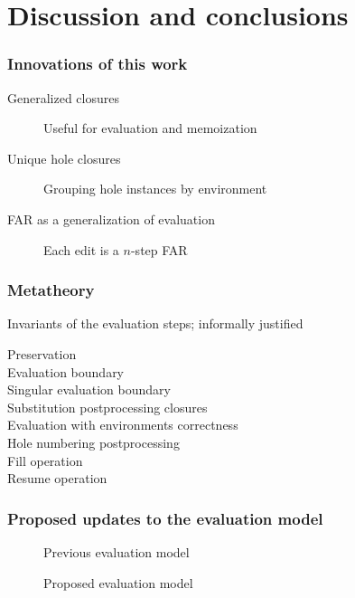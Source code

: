 \documentclass{beamer}
\begin{document}
\section{Discussion and conclusions}

\begin{frame}
  \frametitle{Innovations of this work}

  \begin{description}
  \item[Generalized closures] Useful for evaluation and memoization
  \item[Unique hole closures] Grouping hole instances by environment
  \item[FAR as a generalization of evaluation] Each edit is a $n$-step FAR
  \end{description}
\end{frame}

\begin{frame}
  \frametitle{Metatheory}

  Invariants of the evaluation steps; informally justified

  \begin{description}
  \item[Preservation]
  \item[Evaluation boundary]
  \item[Singular evaluation boundary]
  \item[Substitution postprocessing closures]
  \item[Evaluation with environments correctness]
  \item[Hole numbering postprocessing]
  \item[Fill operation]
  \item[Resume operation]
  \end{description}
\end{frame}

\begin{frame}[allowframebreaks]
  \frametitle{Proposed updates to the evaluation model}

  \begin{figure}
    \centering
    \maxsizebox{\textwidth}{15em}{
      
    }
    \caption{Previous evaluation model}
    \label{fig:prev-evaluation-call-graph}
  \end{figure}

  \begin{figure}
    \centering
    \maxsizebox{\textwidth}{15em}{
      
    }
    \caption{Proposed evaluation model}
    \label{fig:current-evaluation-call-graph}
  \end{figure}
\end{frame}
\end{document}
